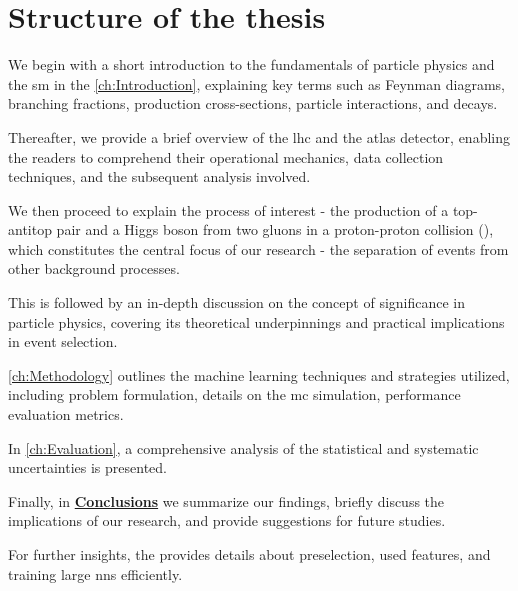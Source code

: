 \chapter*{Structure of the thesis}

We begin with a short introduction to the fundamentals of particle physics and the \gls{sm} in the
\autoref{ch:Introduction}, explaining key terms such as Feynman diagrams, branching fractions, production
cross-sections, particle interactions, and decays.

Thereafter, we provide a brief overview of the \gls{lhc} and the \acrshort{atlas} detector, enabling the readers to
comprehend their operational mechanics, data collection techniques, and the subsequent analysis involved.

We then proceed to explain the process of interest - the production of a top-antitop pair and a Higgs boson from two
gluons in a proton-proton collision (\tth), which constitutes the central focus of our research - the separation of \tth
events from other background processes.

This is followed by an in-depth discussion on the concept of significance in particle physics, covering its theoretical
underpinnings and practical implications in event selection.

\autoref{ch:Methodology} outlines the machine learning techniques and strategies utilized, including
problem formulation, details on the \gls{mc} simulation, performance evaluation metrics.

In \autoref{ch:Evaluation}, a comprehensive analysis of the statistical and systematic uncertainties is
presented.

Finally, in \hyperref[ch:conclusions]{\textbf{Conclusions}} we summarize our findings, briefly discuss the implications
of our research, and provide suggestions for future studies.

For further insights, the \textbf{} provides details about preselection, used features, and training large
\glspl{nn} efficiently.

\glsresetall